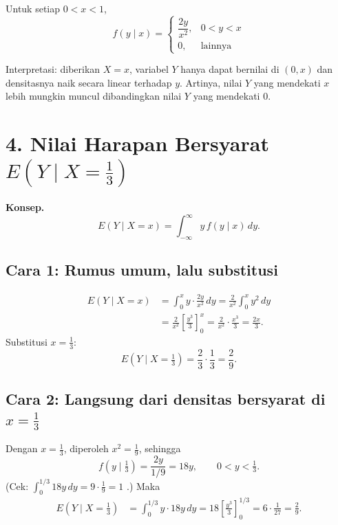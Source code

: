 \documentclass[11pt,a4paper]{article}
\begin{document}
\begin{jawaban}
Untuk setiap $0<x<1$,
\[
f(y\mid x)=\begin{cases} \dfrac{2y}{x^2}, & 0<y<x\\[6pt] 0, & \text{lainnya}\end{cases}
\]
\end{jawaban}

\begin{catatan}
Interpretasi: diberikan $X=x$, variabel $Y$ hanya dapat bernilai di $(0,x)$ dan densitasnya naik secara linear terhadap $y$. Artinya, nilai $Y$ yang mendekati $x$ lebih mungkin muncul dibandingkan nilai $Y$ yang mendekati $0$.
\end{catatan}

\section*{4. Nilai Harapan Bersyarat $E\!\left(Y\mid X=\tfrac13\right)$}

\textbf{Konsep.}
\[
E(Y\mid X=x)=\int_{-\infty}^{\infty} y\,f(y\mid x)\,dy.
\]

\subsection*{Cara 1: Rumus umum, lalu substitusi}
\begin{align*}
E(Y\mid X=x)
&= \int_0^x y\cdot\frac{2y}{x^2}\,dy
 = \frac{2}{x^2}\int_0^x y^2\,dy \\[4pt]
&= \frac{2}{x^2}\left[\frac{y^3}{3}\right]_0^x
 = \frac{2}{x^2}\cdot\frac{x^3}{3}
 = \frac{2x}{3}.
\end{align*}
Substitusi $x=\tfrac13$:
\[
E\!\left(Y\mid X=\tfrac13\right)=\frac23\cdot\frac13=\frac29.
\]

\subsection*{Cara 2: Langsung dari densitas bersyarat di $x=\tfrac13$}
Dengan $x=\tfrac13$, diperoleh $x^2=\tfrac19$, sehingga
\[
f\!\left(y\mid \tfrac13\right)=\frac{2y}{1/9}=18y,\qquad 0<y<\tfrac13.
\]
(Cek: $\int_0^{1/3}18y\,dy = 9\cdot\tfrac19 = 1$ \checkmark.) Maka
\begin{align*}
E\!\left(Y\mid X=\tfrac13\right)
&= \int_0^{1/3} y\cdot 18y\,dy
 = 18\left[\frac{y^3}{3}\right]_0^{1/3}
 = 6\cdot\frac{1}{27}
 = \frac{2}{9}.
\end{align*}
\end{document}
